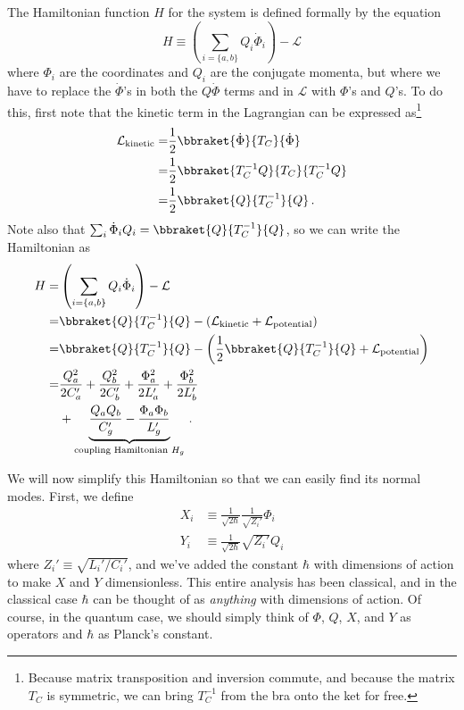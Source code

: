 The Hamiltonian function $H$ for the system is defined formally by the equation
\begin{equation*}
  H \equiv \left( \sum_{i = \{a, b\}} Q_i \dot \Phi_i \right) - \mathcal{L}
\end{equation*}
where $\Phi_i$ are the coordinates and $Q_i$ are the conjugate momenta, but where we have to replace the $\dot \Phi$'s in both the $Q \dot \Phi$ terms and in $\mathcal{L}$ with $\Phi$'s and $Q$'s.
To do this, first note that the kinetic term in the Lagrangian can be expressed as\footnote{Because matrix transposition and inversion commute, and because the matrix $T_C$ is symmetric, we can bring $T_C^{-1}$ from the bra onto the ket for free.}
\begin{align*}
  \mathcal{L}_\text{kinetic}
  =& \frac{1}{2} \bbraket{\dot \Phi}{T_C}{\dot \Phi} \\
  =& \frac{1}{2} \bbraket{T_C^{-1} Q}{T_C}{T_C^{-1} Q} \\
  =& \frac{1}{2} \bbraket{Q}{T_C^{-1}}{Q}
  \, .
\end{align*}
Note also that $\sum_i \dot \Phi_i Q_i = \bbraket{Q}{T_C^{-1}}{Q}$, so we can write the Hamiltonian as
\begin{align}
  H
  =& \left( \sum_{i = \{a, b\}} Q_i \dot \Phi_i \right) - \mathcal{L} \nonumber \\
  =& \bbraket{Q}{T_C^{-1}}{Q} - \left( \mathcal{L}_\text{kinetic} + \mathcal{L}_\text{potential} \right) \nonumber \\
  =& \bbraket{Q}{T_C^{-1}}{Q} - \left( \frac{1}{2} \bbraket{Q}{T_C^{-1}}{Q} + \mathcal{L}_\text{potential} \right) \nonumber \\
  =& \frac{Q_a^2}{2 C_a'} + \frac{Q_b^2}{2 C_b'} + \frac{\Phi_a^2}{2 L_a'} + \frac{\Phi_b^2}{2 L_b'} \nonumber \\
  &+ \underbrace{\frac{Q_a Q_b}{C_g'} - \frac{\Phi_a \Phi_b}{L_g'}}_{\text{coupling Hamiltonian }H_g}
  \, .
\end{align}


We will now simplify this Hamiltonian so that we can easily find its normal modes.
First, we define
\begin{align*}
  X_i &\equiv \frac{1}{\sqrt{2 \hbar}} \frac{1}{\sqrt{Z_i'}} \Phi_i \\
  Y_i &\equiv \frac{1}{\sqrt{2 \hbar}} \sqrt{Z_i'} Q_i
\end{align*}
where $Z_i' \equiv \sqrt{L_i' / C_i'}$, and we've added the constant $\hbar$ with dimensions of action to make $X$ and $Y$ dimensionless.
This entire analysis has been classical, and in the classical case $\hbar$ can be thought of as \emph{anything} with dimensions of action.
Of course, in the quantum case, we should simply think of $\Phi$, $Q$, $X$, and $Y$ as operators and $\hbar$ as Planck's constant.

